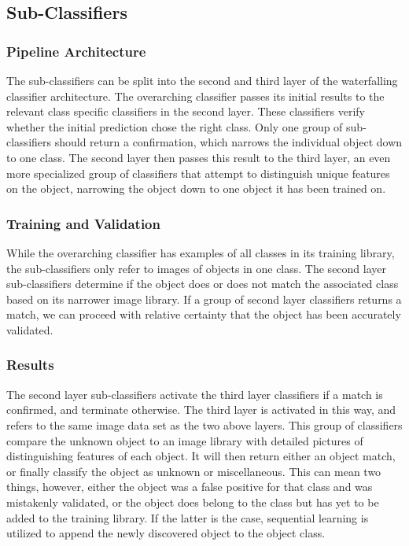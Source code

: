 \documentclass[draftclsnofoot, onecolumn, 10pt, compsoc]{IEEEtran}
\begin{document}
\subsection{Sub-Classifiers}

\subsubsection{Pipeline Architecture}
The sub-classifiers can be split into the second and third layer of the waterfalling classifier architecture. The overarching classifier passes its initial results to the relevant class specific classifiers in the second layer. These classifiers verify whether the initial prediction chose the right class. Only one group of sub-classifiers should return a confirmation, which narrows the individual object down to one class. The second layer then passes this result to the third layer, an even more specialized group of classifiers that attempt to distinguish unique features on the object, narrowing the object down to one object it has been trained on. 

\subsubsection{Training and Validation}
While the overarching classifier has examples of all classes in its training library, the sub-classifiers only refer to images of objects in one class. The second layer sub-classifiers determine if the object does or does not match the associated class based on its narrower image library. If a group of second layer classifiers returns a match, we can proceed with relative certainty that the object has been accurately validated. 

\subsubsection{Results}
The second layer sub-classifiers activate the third layer classifiers if a match is confirmed, and terminate otherwise. The third layer is activated in this way, and refers to the same image data set as the two above layers. This group of classifiers compare the unknown object to an image library with detailed pictures of distinguishing features of each object. It will then return either an object match, or finally classify the object as unknown or miscellaneous. This can mean two things, however, either the object was a false positive for that class and was mistakenly validated, or the object does belong to the class but has yet to be added to the training library. If the latter is the case, sequential learning is utilized to append the newly discovered object to the object class. 
\end{document}
